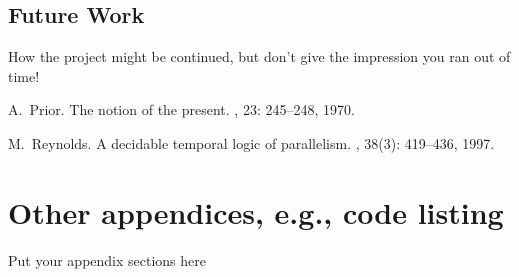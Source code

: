 \documentclass{report}
\begin{document}
\section{Future Work}
How the project might be continued, but don't give the impression you ran out of time!

\appendix


\begin{thebibliography}{HHM99}


A.~Prior.
\newblock The notion of the present.
, 23:  245--248, 1970.


M.~Reynolds.
\newblock A decidable temporal logic of parallelism.
, 38(3):  419--436,
  1997.
\end{thebibliography}
\chapter{Other appendices, e.g., code listing}
Put your appendix sections here
\end{document}
